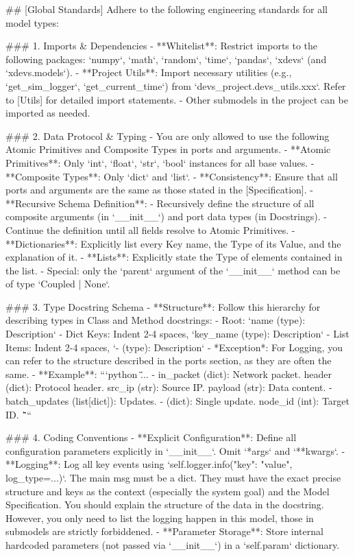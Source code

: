 \begin{promptbox}
## [Global Standards]
Adhere to the following engineering standards for all model types:

### 1. Imports \& Dependencies
- **Whitelist**: Restrict imports to the following packages: `numpy`, `math`, `random`, `time`, `pandas`, `xdevs` (and `xdevs.models`).
- **Project Utils**: Import necessary utilities (e.g., `get_sim_logger`, `get_current_time`) from `devs_project.devs_utils.xxx`. Refer to [Utils] for detailed import statements.
- Other submodels in the project can be imported as needed.

### 2. Data Protocol \& Typing
- You are only allowed to use the following Atomic Primitives and Composite Types in ports and arguments. 
- **Atomic Primitives**: Only `int`, `float`, `str`, `bool` instances for all base values.
- **Composite Types**: Only `dict` and `list`.
- **Consistency**: Ensure that all ports and arguments are the same as those stated in the [Specification]. 
- **Recursive Schema Definition**:
    - Recursively define the structure of all composite arguments (in `__init__`) and port data types (in Docstrings).
    - Continue the definition until all fields resolve to Atomic Primitives.
    - **Dictionaries**: Explicitly list every Key name, the Type of its Value, and the explanation of it. 
    - **Lists**: Explicitly state the Type of elements contained in the list.
- Special: only the `parent` argument of the `__init__` method can be of type `Coupled | None`.

### 3. Type Docstring Schema
- **Structure**: Follow this hierarchy for describing types in Class and Method docstrings:
    - Root: `name (type): Description`
    - Dict Keys: Indent 2-4 spaces, `key_name (type): Description`
    - List Items: Indent 2-4 spaces, `- (type): Description`
- *Exception*: For Logging, you can refer to the structure described in the ports section, as they are often the same.
- **Example**:
    ```python
    \"\"\"
    ...
    - in_packet (dict): Network packet.
        header (dict): Protocol header.
            src_ip (str): Source IP.
        payload (str): Data content.
    - batch_updates (list[dict]): Updates.
        - (dict): Single update.
            node_id (int): Target ID.
    \"\"\"
    ```

### 4. Coding Conventions
- **Explicit Configuration**: Define all configuration parameters explicitly in `__init__`. Omit `*args` and `**kwargs`.
- **Logging**: Log all key events using `self.logger.info({{"key": "value"}}, log_type=...)`. The main msg must be a dict. They must have the exact precise structure and keys as the context (especially the system goal) and the Model Specification. You should explain the structure of the data in the docstring. However, you only need to list the logging happen in this model, those in submodels are strictly forbiddened.
- **Parameter Storage**: Store internal hardcoded parameters (not passed via `__init__`) in a `self.param` dictionary.
\end{promptbox}

